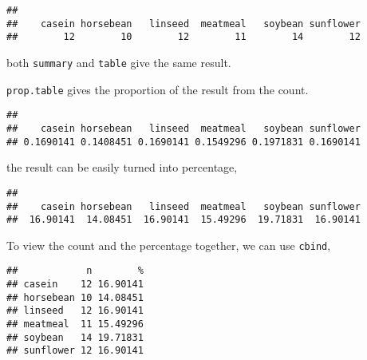 \documentclass[]{book}
\newenvironment{Shaded}{\begin{snugshade}}{\end{snugshade}}
\newcommand{\KeywordTok}[1]{\textcolor[rgb]{0.13,0.29,0.53}{\textbf{{#1}}}}
\newcommand{\DataTypeTok}[1]{\textcolor[rgb]{0.13,0.29,0.53}{{#1}}}
\newcommand{\DecValTok}[1]{\textcolor[rgb]{0.00,0.00,0.81}{{#1}}}
\newcommand{\StringTok}[1]{\textcolor[rgb]{0.31,0.60,0.02}{{#1}}}
\newcommand{\NormalTok}[1]{{#1}}
\theoremstyle{definition}
\theoremstyle{definition}
\theoremstyle{remark}
\begin{document}
\begin{verbatim}
## 
##    casein horsebean   linseed  meatmeal   soybean sunflower 
##        12        10        12        11        14        12
\end{verbatim}

both \texttt{summary} and \texttt{table} give the same result.

\texttt{prop.table} gives the proportion of the result from the count.

\begin{Shaded}
\end{Shaded}

\begin{verbatim}
## 
##    casein horsebean   linseed  meatmeal   soybean sunflower 
## 0.1690141 0.1408451 0.1690141 0.1549296 0.1971831 0.1690141
\end{verbatim}

the result can be easily turned into percentage,

\begin{Shaded}
\end{Shaded}

\begin{verbatim}
## 
##    casein horsebean   linseed  meatmeal   soybean sunflower 
##  16.90141  14.08451  16.90141  15.49296  19.71831  16.90141
\end{verbatim}

To view the count and the percentage together, we can use
\texttt{cbind},

\begin{Shaded}
\end{Shaded}

\begin{verbatim}
##            n        %
## casein    12 16.90141
## horsebean 10 14.08451
## linseed   12 16.90141
## meatmeal  11 15.49296
## soybean   14 19.71831
## sunflower 12 16.90141
\end{verbatim}
\end{document}
